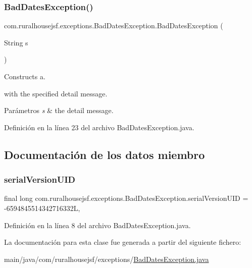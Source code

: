 \subsubsection{\texorpdfstring{BadDatesException()}{BadDatesException()}\hspace{0.1cm}{\footnotesize\ttfamily [2/2]}}
{\footnotesize\ttfamily com.\+ruralhousejsf.\+exceptions.\+Bad\+Dates\+Exception.\+Bad\+Dates\+Exception (\begin{DoxyParamCaption}\item[{String}]{s }\end{DoxyParamCaption})}



Constructs a. 


\begin{DoxyCode}{0}
\end{DoxyCode}
 with the specified detail message.


\begin{DoxyParams}{Parámetros}
{\em s} & the detail message. \\
\hline
\end{DoxyParams}


Definición en la línea 23 del archivo Bad\+Dates\+Exception.\+java.



\subsection{Documentación de los datos miembro}
\mbox{\label{classcom_1_1ruralhousejsf_1_1exceptions_1_1_bad_dates_exception_a455e5569f117b53852ac14206bb2177f}} 
\subsubsection{\texorpdfstring{serialVersionUID}{serialVersionUID}}
{\footnotesize\ttfamily final long com.\+ruralhousejsf.\+exceptions.\+Bad\+Dates\+Exception.\+serial\+Version\+U\+ID = -\/6594845514342716332L\hspace{0.3cm}{\ttfamily [static]}, {\ttfamily [private]}}



Definición en la línea 8 del archivo Bad\+Dates\+Exception.\+java.



La documentación para esta clase fue generada a partir del siguiente fichero\+:\begin{DoxyCompactItemize}
\item 
main/java/com/ruralhousejsf/exceptions/\mbox{\hyperlink{_bad_dates_exception_8java}{Bad\+Dates\+Exception.\+java}}\end{DoxyCompactItemize}
